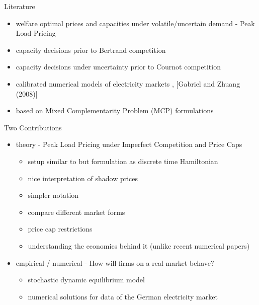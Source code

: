 \begin{frame}{Literature}

\begin{itemize}
	\item welfare optimal prices and capacities under volatile/uncertain demand - Peak Load Pricing \cite{Crew1986}
	\item capacity decisions prior to Bertrand competition \cite{Kreps1983}
	\item capacity decisions under uncertainty prior to Cournot competition \cite{Gabszewicz1997}
\end{itemize}

\begin{itemize}
	\item calibrated numerical models of electricity markets \cite{Genc2007}, [Gabriel and Zhuang (2008)]
	\item based on Mixed Complementarity Problem (MCP) formulations \cite{Ferris2000}
\end{itemize}

\end{frame}

\begin{frame}{Two Contributions}

\begin{itemize}

\item theory - Peak Load Pricing under Imperfect Competition and Price Caps	

\begin{itemize}
  \item setup similar to \cite{Gabszewicz1997} but formulation as discrete time Hamiltonian
	\item nice interpretation of shadow prices
	\item simpler notation
  \item compare different market forms
  \item price cap restrictions
  \item understanding the economics behind it (unlike recent numerical papers)
\end{itemize}

\item empirical / numerical - How will firms on a real market behave?

\begin{itemize}
	\item stochastic dynamic equilibrium model
	\item numerical solutions for data of the German electricity market
\end{itemize}

\end{itemize}
\end{frame}


